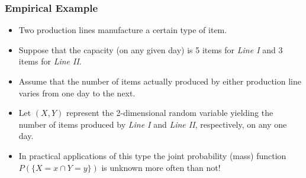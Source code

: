 \documentclass[notes=show,handout]{beamer}
\newenvironment{stepitemize}{\begin{itemize}[<+->]}{\end{itemize} }
\renewcommand{\Pr}{P}
\begin{document}
\begin{frame}%

\frametitle{Empirical Example}

\begin{example}

\begin{stepitemize}
\item Two production lines manufacture a certain type of item.

\item Suppose that the capacity (on any given day) is 5 items for \emph{Line
I }and 3 items for \emph{Line II}.

\item Assume that the number of items actually produced by either production
line varies from one day to the next.

\item Let $(X,Y)$ represent the 2-dimensional random variable yielding the
number of items produced by \emph{Line I} and \emph{Line II}, respectively,
on any one day.

\item In practical applications of this type the joint probability (mass)
function $\Pr(\{X=x\cap Y=y\})$ is unknown more often than not!
\end{stepitemize}
\end{example}

\end{frame}%
\end{document}
